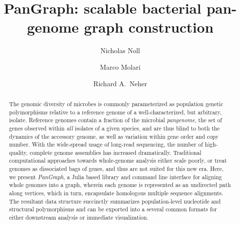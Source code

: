 \documentclass[aps,rmp,reprint,superscriptaddress,notitlepage,10pt]{revtex4-1}
\begin{document}
\title{PanGraph: scalable bacterial pan-genome graph construction}
\author{Nicholas Noll}
\author{Marco Molari}
\author{Richard A.~Neher}

\begin{abstract}
    The genomic diversity of microbes is commonly parameterized as population genetic polymorphisms relative to a reference genome of a well-characterized, but arbitrary, isolate.
    Reference genomes contain a fraction of the microbial \emph{pangenome}, the set of genes observed within \emph{all} isolates of a given species, and are thus blind to both the dynamics of the accessory genome, as well as variation within gene order and copy number.
    With the wide-spread usage of long-read sequencing, the number of high-quality, complete genome assemblies has increased dramatically.
    Traditional computational approaches towards whole-genome analysis either scale poorly, or treat genomes as dissociated bags of genes, and thus are not suited for this new era.
    Here, we present \emph{PanGraph}, a Julia based library and command line interface for aligning whole genomes into a graph, wherein each genome is represented as an undirected path along vertices, which in turn, encapsulate homologous multiple sequence alignments.
    The resultant data structure succinctly summarizes population-level nucleotide and structural polymorphisms and can be exported into a several common formats for either downstream analysis or immediate visualization.
\end{abstract}

\maketitle

\end{document}
